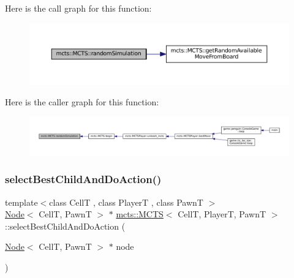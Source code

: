 Here is the call graph for this function\+:
\nopagebreak
\begin{figure}[H]
\begin{center}
\leavevmode
\includegraphics[width=350pt]{classmcts_1_1_m_c_t_s_ad465558c1f4933cae2a32ff7394fc49b_cgraph}
\end{center}
\end{figure}
Here is the caller graph for this function\+:
\nopagebreak
\begin{figure}[H]
\begin{center}
\leavevmode
\includegraphics[width=350pt]{classmcts_1_1_m_c_t_s_ad465558c1f4933cae2a32ff7394fc49b_icgraph}
\end{center}
\end{figure}
\mbox{\label{classmcts_1_1_m_c_t_s_a5a3c4a056b0611c19839d6757871653b}} 
\subsubsection{\texorpdfstring{select\+Best\+Child\+And\+Do\+Action()}{selectBestChildAndDoAction()}}
{\footnotesize\ttfamily template$<$class CellT , class PlayerT , class PawnT $>$ \\
\hyperlink{structmcts_1_1_node}{Node}$<$ CellT, PawnT $>$ $\ast$ \hyperlink{classmcts_1_1_m_c_t_s}{mcts\+::\+M\+C\+TS}$<$ CellT, PlayerT, PawnT $>$\+::select\+Best\+Child\+And\+Do\+Action (\begin{DoxyParamCaption}\item[{\hyperlink{structmcts_1_1_node}{Node}$<$ CellT, PawnT $>$ $\ast$}]{node }\end{DoxyParamCaption})\hspace{0.3cm}{\ttfamily [protected]}}

